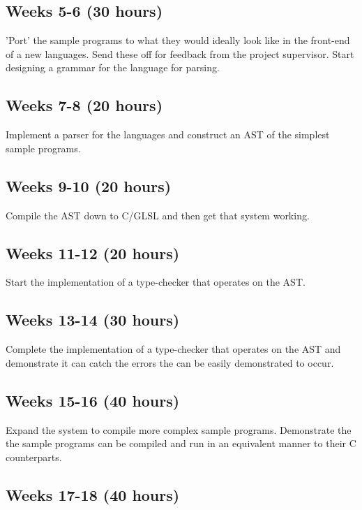 \documentclass[11pt]{article}
\begin{document}
\subsection{Weeks 5-6 (30 hours)}

'Port' the sample programs to what they would ideally look like in the
front-end of a new languages. Send these off for feedback from the project
supervisor. Start designing a grammar for the language for parsing.

\subsection{Weeks 7-8 (20 hours)}

Implement a parser for the languages and construct an AST of the simplest
sample programs.

\subsection{Weeks 9-10 (20 hours)}

Compile the AST down to C/GLSL and then get that system working.

\subsection{Weeks 11-12 (20 hours)}

Start the implementation of a type-checker that operates on the AST.

\subsection{Weeks 13-14 (30 hours)}

Complete the implementation of a type-checker that operates on the AST and
demonstrate it can catch the errors the can be easily demonstrated to occur.

\subsection{Weeks 15-16 (40 hours)}

Expand the system to compile more complex sample programs. Demonstrate the the
sample programs can be compiled and run in an equivalent manner to their C
counterparts.

\subsection{Weeks 17-18 (40 hours)}
\end{document}

